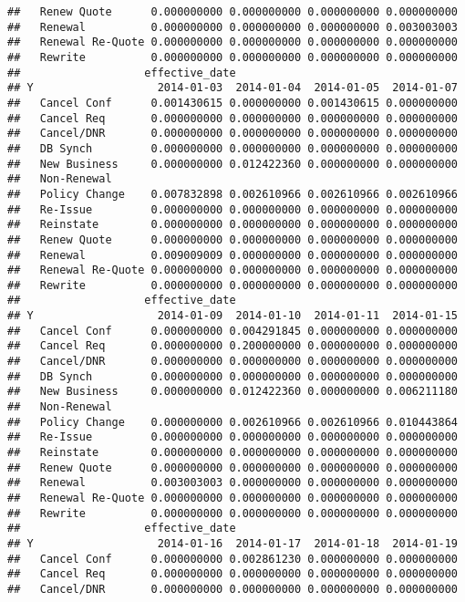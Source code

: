 \documentclass[]{article}
\begin{document}
\begin{verbatim}
##   Renew Quote      0.000000000 0.000000000 0.000000000 0.000000000
##   Renewal          0.000000000 0.000000000 0.000000000 0.003003003
##   Renewal Re-Quote 0.000000000 0.000000000 0.000000000 0.000000000
##   Rewrite          0.000000000 0.000000000 0.000000000 0.000000000
##                   effective_date
## Y                   2014-01-03  2014-01-04  2014-01-05  2014-01-07
##   Cancel Conf      0.001430615 0.000000000 0.001430615 0.000000000
##   Cancel Req       0.000000000 0.000000000 0.000000000 0.000000000
##   Cancel/DNR       0.000000000 0.000000000 0.000000000 0.000000000
##   DB Synch         0.000000000 0.000000000 0.000000000 0.000000000
##   New Business     0.000000000 0.012422360 0.000000000 0.000000000
##   Non-Renewal                                                     
##   Policy Change    0.007832898 0.002610966 0.002610966 0.002610966
##   Re-Issue         0.000000000 0.000000000 0.000000000 0.000000000
##   Reinstate        0.000000000 0.000000000 0.000000000 0.000000000
##   Renew Quote      0.000000000 0.000000000 0.000000000 0.000000000
##   Renewal          0.009009009 0.000000000 0.000000000 0.000000000
##   Renewal Re-Quote 0.000000000 0.000000000 0.000000000 0.000000000
##   Rewrite          0.000000000 0.000000000 0.000000000 0.000000000
##                   effective_date
## Y                   2014-01-09  2014-01-10  2014-01-11  2014-01-15
##   Cancel Conf      0.000000000 0.004291845 0.000000000 0.000000000
##   Cancel Req       0.000000000 0.200000000 0.000000000 0.000000000
##   Cancel/DNR       0.000000000 0.000000000 0.000000000 0.000000000
##   DB Synch         0.000000000 0.000000000 0.000000000 0.000000000
##   New Business     0.000000000 0.012422360 0.000000000 0.006211180
##   Non-Renewal                                                     
##   Policy Change    0.000000000 0.002610966 0.002610966 0.010443864
##   Re-Issue         0.000000000 0.000000000 0.000000000 0.000000000
##   Reinstate        0.000000000 0.000000000 0.000000000 0.000000000
##   Renew Quote      0.000000000 0.000000000 0.000000000 0.000000000
##   Renewal          0.003003003 0.000000000 0.000000000 0.000000000
##   Renewal Re-Quote 0.000000000 0.000000000 0.000000000 0.000000000
##   Rewrite          0.000000000 0.000000000 0.000000000 0.000000000
##                   effective_date
## Y                   2014-01-16  2014-01-17  2014-01-18  2014-01-19
##   Cancel Conf      0.000000000 0.002861230 0.000000000 0.000000000
##   Cancel Req       0.000000000 0.000000000 0.000000000 0.000000000
##   Cancel/DNR       0.000000000 0.000000000 0.000000000 0.000000000

\end{verbatim}
\end{document}
